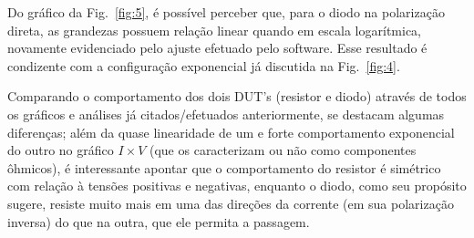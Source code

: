 Do gráfico da Fig.~\ref{fig:5}, é possível perceber que, para o diodo na polarização direta, as grandezas possuem relação linear quando em escala logarítmica, novamente evidenciado pelo ajuste efetuado pelo software. Esse resultado é condizente com a configuração exponencial já discutida na Fig.~\ref{fig:4}.

Comparando o comportamento dos dois DUT's (resistor e diodo) através de todos os gráficos e análises já citados/efetuados anteriormente, se destacam algumas diferenças; além da quase linearidade de um e forte comportamento exponencial do outro no gráfico $I\times V$ (que os caracterizam ou não como componentes ôhmicos),  é interessante apontar que o comportamento do resistor é simétrico com relação à tensões positivas e negativas, enquanto o diodo, como seu propósito sugere, resiste muito mais em uma das direções da corrente (em sua polarização inversa) do que na outra, que ele permita a passagem.
